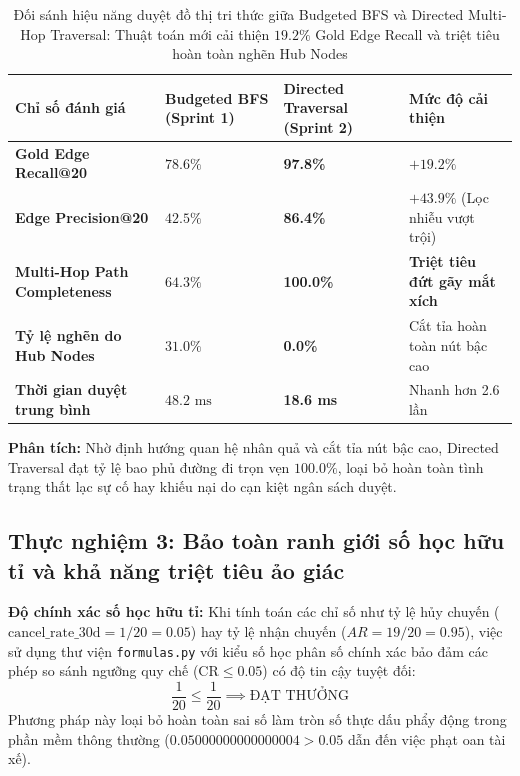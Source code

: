\documentclass[a4paper,11pt]{article}
\begin{document}
\begin{table}[htbp]
\centering
\footnotesize
\caption{Đối sánh hiệu năng duyệt đồ thị tri thức giữa Budgeted BFS và Directed Multi-Hop Traversal: Thuật toán mới cải thiện $19.2\%$ Gold Edge Recall và triệt tiêu hoàn toàn nghẽn Hub Nodes}
\label{tab:eval-graph}
\vspace{0.15cm}
\begin{tabularx}{\textwidth}{>{\raggedright\arraybackslash}X>{\centering\arraybackslash}X>{\centering\arraybackslash}X>{\centering\arraybackslash}X}
\toprule
\textbf{Chỉ số đánh giá} & \textbf{Budgeted BFS (Sprint 1)} & \textbf{Directed Traversal (Sprint 2)} & \textbf{Mức độ cải thiện} \\
\midrule
\textbf{Gold Edge Recall@20} & $78.6\%$ & \textbf{97.8\%} & $+19.2\%$ \\
\textbf{Edge Precision@20} & $42.5\%$ & \textbf{86.4\%} & $+43.9\%$ (Lọc nhiễu vượt trội) \\
\textbf{Multi-Hop Path Completeness} & $64.3\%$ & \textbf{100.0\%} & \textbf{Triệt tiêu đứt gãy mắt xích} \\
\textbf{Tỷ lệ nghẽn do Hub Nodes} & $31.0\%$ & \textbf{0.0\%} & Cắt tỉa hoàn toàn nút bậc cao \\
\textbf{Thời gian duyệt trung bình} & $48.2\text{ ms}$ & \textbf{18.6 ms} & Nhanh hơn 2.6 lần \\
\bottomrule
\end{tabularx}
\end{table}

\textbf{Phân tích:} Nhờ định hướng quan hệ nhân quả và cắt tỉa nút bậc cao, Directed Traversal đạt tỷ lệ bao phủ đường đi trọn vẹn $100.0\%$, loại bỏ hoàn toàn tình trạng thất lạc sự cố hay khiếu nại do cạn kiệt ngân sách duyệt.

\subsection{Thực nghiệm 3: Bảo toàn ranh giới số học hữu tỉ và khả năng triệt tiêu ảo giác}
\label{sec:eval-math}
\textbf{Độ chính xác số học hữu tỉ:} Khi tính toán các chỉ số như tỷ lệ hủy chuyến ($\text{cancel\_rate\_30d} = 1/20 = 0.05$) hay tỷ lệ nhận chuyến ($AR = 19/20 = 0.95$), việc sử dụng thư viện \nolinkurl{formulas.py} với kiểu số học phân số chính xác bảo đảm các phép so sánh ngưỡng quy chế ($\text{CR} \le 0.05$) có độ tin cậy tuyệt đối:
\begin{equation}
    \frac{1}{20} \le \frac{1}{20} \implies \text{ĐẠT THƯỞNG}
    \label{eq:rational-bound}
\end{equation}
Phương pháp này loại bỏ hoàn toàn sai số làm tròn số thực dấu phẩy động trong phần mềm thông thường ($0.05000000000000004 > 0.05$ dẫn đến việc phạt oan tài xế).
\end{document}
